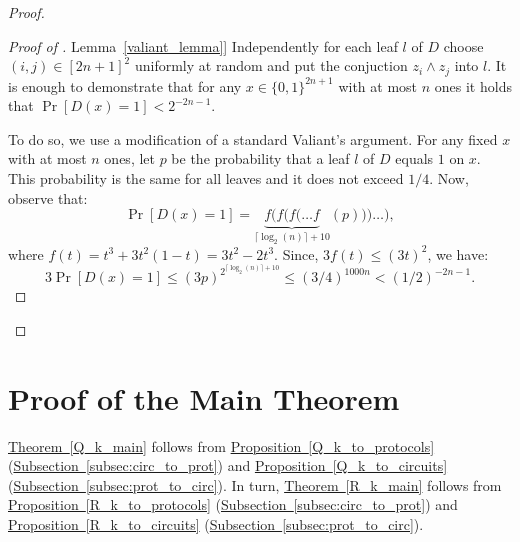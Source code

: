 \documentclass[11pt]{article}
\numberwithin{equation}{section}
\theoremstyle{definition}
\theoremstyle{plain}
\newcommand{\expref}[2]{\hyperref[#2]{#1~\ref{#2}}}
\begin{document}
\begin{proof}
\begin{proof}[Proof of \expref{Lemma}{valiant_lemma}]
Independently for each leaf $l$ of $D$ choose $(i, j) \in [2n + 1]^2$ uniformly at random and put the  conjuction $z_i \land z_j$ into $l$. It is enough to demonstrate that for any $x\in\{0, 1\}^{2n + 1}$ with at most $n$ ones it holds that $\Pr[D(x) = 1] < 2^{-2n - 1}$. 

To do so, we use a modification of a standard Valiant's argument. For any fixed $x$ with at most $n$ ones, let $p$ be the probability that a leaf $l$ of $D$ equals $1$ on $x$. This probability is the same for all leaves and it does not exceed $1/4$. Now, observe that:
\[\Pr[D(x) = 1] = \underbrace{f(f(f(\ldots f}_{\text{$\lceil\log_2(n)\rceil + 10$}}(p)))\ldots),\]
where $f(t) = t^3 + 3 t^2 (1 - t) = 3t^2 -2t^3$. Since, $3f(t) \le (3t)^2$, we have:
\[3\Pr[D(x) = 1] \le (3p)^{2^{\lceil\log_2(n)\rceil + 10}}\le (3/4)^{1000 n} < (1/2)^{-2n - 1}.\]
\end{proof}
\end{proof}





























\section{Proof of the Main Theorem} \label{sec:proof_main}

\expref{Theorem}{Q_k_main} follows from \expref{Proposition}{Q_k_to_protocols} (\expref{Subsection}{subsec:circ_to_prot}) and \expref{Proposition}{Q_k_to_circuits} (\expref{Subsection}{subsec:prot_to_circ}).  In turn, \expref{Theorem}{R_k_main} follows from \expref{Proposition}{R_k_to_protocols} (\expref{Subsection}{subsec:circ_to_prot}) and \expref{Proposition}{R_k_to_circuits} (\expref{Subsection}{subsec:prot_to_circ}). 
\end{document}
